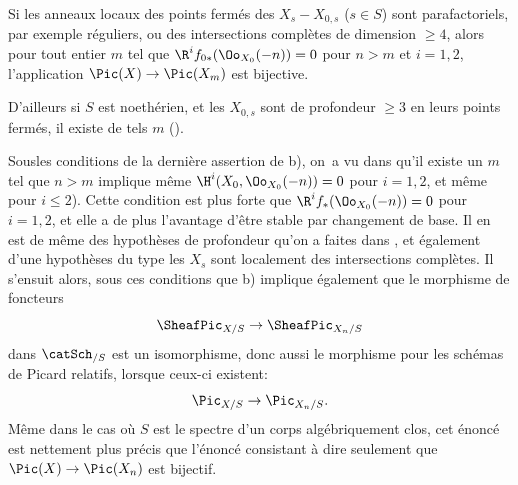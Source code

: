 \begin{corollaire}
\begin{enumeratea}
\item
Si les anneaux locaux des points ferm\'es des $X_s- X_{0, s}$ ($s\in S$) sont \og parafactoriels\fg, par exemple r\'eguliers, ou des intersections compl\`etes de dimension $\geq 4$, alors pour tout entier $m$ tel que $\R^if_{0\ast}(\Oo_{X_0}(-n))=0$ pour $n>m$ et $i=1, 2$, l'application $\Pic(X)\to \Pic(X_m)$ est bijective.

D'ailleurs si $S$ est noeth\'erien, et les $ X_{0, s}$ sont de profondeur $\geq 3$ en leurs points ferm\'es, il existe de tels $m$ (\cf {}).
\end{enumeratea}
\end{corollaire}

\begin{remarque} \label{XII.4.10}
Sous\pageoriginale les conditions de la derni\`ere assertion de  b), on~a vu dans  qu'il existe un $m$ tel que $n>m$ implique m\^eme $\H^i(X_0, \Oo_{X_0}(-n))=0$ pour $i=1, 2$, et m\^eme pour $i\leq 2$). Cette condition est plus forte que $\R^if_{\ast}(\Oo_{X_0}(-n))=0$ pour $i=1, 2$, et elle a de plus l'avantage d'\^etre stable par changement de base. Il en est de m\^eme des hypoth\`eses de profondeur qu'on a faites dans , et \'egalement d'une hypoth\`eses du type \og les $X_s$ sont localement des intersections compl\`etes\fg. Il s'ensuit alors, sous ces conditions que  b) implique \'egalement que le morphisme de foncteurs
\[
\SheafPic_{X/S}\to \SheafPic_{X_n/S}
\]
dans $\catSch_{/S}$ est un isomorphisme, donc aussi le morphisme pour les sch\'emas de Picard relatifs, lorsque ceux-ci existent:
\[
\Pic_{X/S}\to \Pic_{X_n/S}.
\]
M\^eme dans le cas o\`u $S$ est le spectre d'un corps alg\'ebriquement clos, cet \'enonc\'e est nettement plus pr\'ecis que l'\'enonc\'e consistant \`a dire seulement que $\Pic(X)\to \Pic(X_n)$ est bijectif.


\end{remarque}
